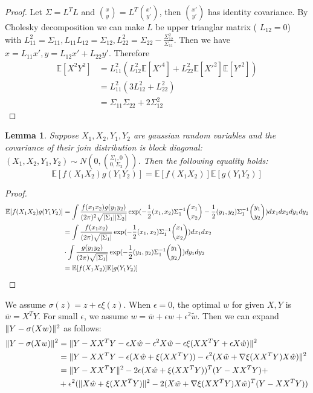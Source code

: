 \documentclass{article}
\DeclarePairedDelimiter\abs{\lvert}{\rvert}
\DeclarePairedDelimiter\norm{\lVert}{\rVert}
\def\E{\mathbb{E}}
\newtheorem{lemma}{Lemma}
\begin{document}
\begin{proof}
Let $\Sigma = L^T L $ and $\binom{x}{y} = L^T \binom{x'}{y'}$, then $\binom{x'}{y'}$ has identity covariance. By Cholesky decomposition we can make $L$ be upper trianglar matrix (
$L_{12}=0$) with $L_{11}^2 = \Sigma_{11}, L_{11}L_{12} = \Sigma_{12}, L_{22}^2 = \Sigma_{22} - \frac{\Sigma_{12}^2}{\Sigma_{11}}$. Then we have $x = L_{11} x', y = L_{12} x' + L_{22} y'$. Therefore
\begin{align*}
\E[X^2 Y^2] & = L_{11}^2 (L_{12}^2\E[X'^4]+ L^2_{22}\E[X'^2]\E[Y'^2]) \\
& = L_{11}^2(3L_{12}^2 + L^2_{22}) \\
& = \Sigma_{11}\Sigma_{22} + 2\Sigma_{12}^2
\end{align*}
\end{proof}
\begin{lemma}\label{lem:abcd}
Suppose $X_1, X_2, Y_1, Y_2$ are gaussian random variables and the covariance of their join distribution is block diagonal:
$(X_1, X_2, Y_1, Y_2) \sim N(0, \binom{\Sigma_1, 0}{0, \Sigma_2})$. Then the following equality holds:
\begin{equation}
\E[f(X_1X_2)g(Y_1Y_2)] = \E[f(X_1 X_2)] \E[g(Y_1 Y_2)]
\end{equation}
\end{lemma}
\begin{proof}
\begin{align*}
\E[f(X_1X_2)g(Y_1Y_2)] & = \int \frac{f(x_1 x_2) g(y_1 y_2) }{(2\pi)^2 \sqrt{\abs{\Sigma_1}\abs{\Sigma_2}}}\exp(-\frac{1}{2}(x_1, x_2) \Sigma_1^{-1} \binom{x_1}{x_2}-\frac{1}{2}(y_1, y_2) \Sigma_1^{-1} \binom{y_1}{y_2})dx_1 d x_2 dy_1 dy_2 \\
& = \int \frac{f(x_1 x_2)  }{(2\pi) \sqrt{\abs{\Sigma_1}}}\exp(-\frac{1}{2}(x_1, x_2) \Sigma_1^{-1} \binom{x_1}{x_2})dx_1 d x_2  \\
&\cdot  \int \frac{ g(y_1 y_2)  }{(2\pi) \sqrt{\abs{\Sigma_1}}}\exp(-\frac{1}{2}(y_1, y_2) \Sigma_1^{-1} \binom{y_1}{y_2})dy_1 d y_2 \\
& = \E[f(X_1 X_2)] \E[g(Y_1 Y_2)]
\end{align*}
\end{proof}
We assume $\sigma(z) = z + \epsilon \xi(z)$. When $\epsilon = 0$, the optimal $w$ for given $X, Y$ is 
$\bar{w} = X^T Y $. For small $\epsilon$, we assume $ w = \bar{w} + \epsilon \hat{w} + \epsilon^2 \tilde{w}$. Then we can expand $\norm{Y - \sigma (X w ) }^2$ as follows:
\begin{align*}
\norm{Y - \sigma (X w ) }^2 & = \norm{Y - XX^T Y - \epsilon X \hat{w} - \epsilon^2 X \tilde{w} - \epsilon \xi(XX^T Y + \epsilon X\hat{w}) }^2 \\
& = \norm{ Y - XX^T Y - \epsilon (X\hat{w} + \xi(XX^T Y)) - \epsilon^2(X\tilde{w} + \nabla \xi(XX^TY)X\hat{w})}^2 \\
& = \norm{Y-XX^T Y }^2 - 2 \epsilon (X \hat{w} + \xi(XX^TY))^T (Y-XX^TY) +\\
& +\epsilon^2(\norm{X\hat{w} + \xi(XX^TY)}^2 - 2 (X \tilde{w}+ \nabla \xi(XX^TY)X\hat{w})^T(Y-XX^TY))
\end{align*}
\end{document}
